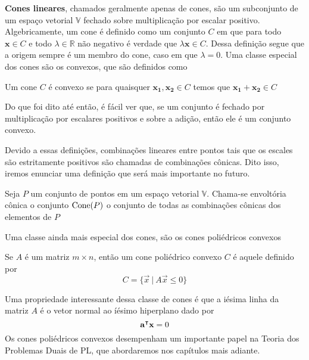 \textbf{Cones lineares}, chamados geralmente apenas de cones, são um subconjunto de um espaço vetorial $\mathbb{V}$ fechado sobre multiplicação por escalar positivo. Algebricamente, um cone é definido como um conjunto $C$ em que para todo $\mathbf{x} \in C$ e todo $\lambda \in \mathbb{R}$ não negativo é verdade que \(\lambda \mathbf{x} \in C\). Dessa definição segue que a origem sempre é um membro do cone, caso em que $\lambda = 0$. Uma classe especial dos cones são os convexos, que são definidos como

\begin{def:cone convexo}
	Um cone $C$ é convexo se para quaisquer $\mathbf{x_1, x_2} \in C$ temos que $\mathbf{x_1} + \mathbf{x_2} \in C$
\end{def:cone convexo}

Do que foi dito até então, é fácil ver que, se um conjunto é fechado por multiplicação por escalares positivos e sobre a adição, então ele é um conjunto convexo.

Devido a essas definições, combinações lineares entre pontos tais que os escales são estritamente positivos são chamadas de combinações cônicas. Dito isso, iremos enunciar uma definição que será mais importante no futuro.

\begin{def:cone hull}
	Seja $P$ um conjunto de pontos em um espaço vetorial $\mathbb{V}$. Chama-se envoltória cônica o conjunto $\mathrm{Cone}(P)$ o conjunto de todas as combinações cônicas dos elementos de $P$
\end{def:cone hull}

Uma classe ainda mais especial dos cones, são os cones poliédricos convexos

\begin{def:cpc}
	Se $A$ é um matriz $m \times n$, então um cone poliédrico convexo $C$ é aquele definido por
	\begin{equation*}
		C = \{\vec{x}\ |\ A \vec{x} \leq 0\}
	\end{equation*}  
\end{def:cpc}

Uma propriedade interessante dessa classe de cones é que a iésima linha da matriz $A$ é o vetor normal ao íésimo hiperplano dado por \[\mathbf{\mathbf{a}^\intercal x} = 0\]Os cones poliédricos convexos desempenham um importante papel na Teoria dos Problemas Duais de PL, que abordaremos nos capítulos mais adiante.

